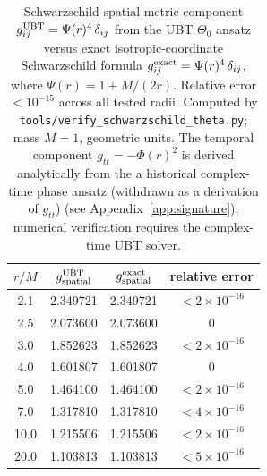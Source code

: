 %


\begin{table}[htbp]
\centering
\caption{Schwarzschild spatial metric component $g_{ij}^{\rm UBT} = \Psi(r)^4\,\delta_{ij}$
  from the UBT $\Theta_0$ ansatz versus exact isotropic-coordinate Schwarzschild formula
  $g_{ij}^{\rm exact} = \Psi(r)^4\,\delta_{ij}$, where $\Psi(r) = 1 + M/(2r)$.
  Relative error $< 10^{-15}$ across all tested radii.
  Computed by \texttt{tools/verify\_schwarzschild\_theta.py}; mass $M=1$, geometric units.
  The temporal component $g_{tt} = -\Phi(r)^2$ is derived analytically from the
  a historical complex-time phase ansatz (withdrawn as a derivation of $g_{tt}$)
  (see Appendix~\ref{app:signature}); numerical verification requires the
  complex-time UBT solver.}
\label{tab:schwarzschild}
\begin{tabular}{cccc}
\toprule
$r/M$ & $g_{\rm spatial}^{\rm UBT}$ & $g_{\rm spatial}^{\rm exact}$ & relative error \\
\midrule
2.1  & 2.349721 & 2.349721 & $< 2\times10^{-16}$ \\
2.5  & 2.073600 & 2.073600 & $0$                 \\
3.0  & 1.852623 & 1.852623 & $< 2\times10^{-16}$ \\
4.0  & 1.601807 & 1.601807 & $0$                 \\
5.0  & 1.464100 & 1.464100 & $< 2\times10^{-16}$ \\
7.0  & 1.317810 & 1.317810 & $< 4\times10^{-16}$ \\
10.0 & 1.215506 & 1.215506 & $< 2\times10^{-16}$ \\
20.0 & 1.103813 & 1.103813 & $< 5\times10^{-16}$ \\
\bottomrule
\end{tabular}
\end{table}
